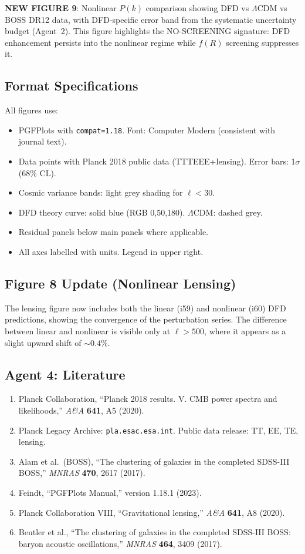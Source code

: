 \documentclass[11pt,a4paper]{article}
\begin{document}
\textbf{NEW FIGURE 9}: Nonlinear $P(k)$ comparison showing DFD vs $\Lambda$CDM vs BOSS DR12 data, with DFD-specific error band from the systematic uncertainty budget (Agent~2). This figure highlights the NO-SCREENING signature: DFD enhancement persists into the nonlinear regime while $f(R)$ screening suppresses it.

\subsection{Format Specifications}

All figures use:
\begin{itemize}
\item PGFPlots with \texttt{compat=1.18}. Font: Computer Modern (consistent with journal text).
\item Data points with Planck 2018 public data (TTTEEE+lensing). Error bars: 1$\sigma$ (68\% CL).
\item Cosmic variance bands: light grey shading for $\ell < 30$.
\item DFD theory curve: solid blue (RGB 0,50,180). $\Lambda$CDM: dashed grey.
\item Residual panels below main panels where applicable.
\item All axes labelled with units. Legend in upper right.
\end{itemize}

\subsection{Figure 8 Update (Nonlinear Lensing)}

The lensing figure now includes both the linear (i59) and nonlinear (i60) DFD predictions, showing the convergence of the perturbation series. The difference between linear and nonlinear is visible only at $\ell > 500$, where it appears as a slight upward shift of $\sim 0.4\%$.

\subsection{Agent 4: Literature}

\begin{enumerate}
\item Planck Collaboration, ``Planck 2018 results. V. CMB power spectra and likelihoods,'' \textit{A\&A} \textbf{641}, A5 (2020).
\item Planck Legacy Archive: \texttt{pla.esac.esa.int}. Public data release: TT, EE, TE, lensing.
\item Alam et al.\ (BOSS), ``The clustering of galaxies in the completed SDSS-III BOSS,'' \textit{MNRAS} \textbf{470}, 2617 (2017).
\item Feindt, ``PGFPlots Manual,'' version 1.18.1 (2023).
\item Planck Collaboration VIII, ``Gravitational lensing,'' \textit{A\&A} \textbf{641}, A8 (2020).
\item Beutler et al., ``The clustering of galaxies in the completed SDSS-III BOSS: baryon acoustic oscillations,'' \textit{MNRAS} \textbf{464}, 3409 (2017).
\end{enumerate}
\end{document}
